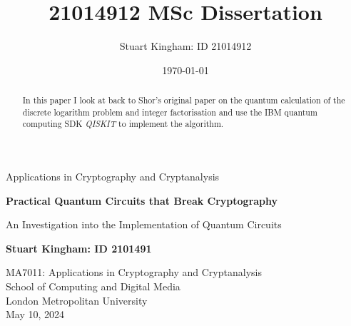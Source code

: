 \documentclass[11pt,a4paper]{article}
\author{Stuart Kingham: ID 21014912}
\title{21014912 MSc Dissertation}
\date{\today}
\begin{document}
\doublespacing

\begin{titlepage}
  \vspace*{\fill}
  \begin{center}
       \vspace*{1cm}

       {\LARGE Applications in Cryptography and Cryptanalysis}

       \vspace*{1cm}
       {\large \textbf{Practical Quantum Circuits that Break Cryptography}}
       
       \vspace{0.2cm}
       {\large An Investigation into the Implementation of Quantum Circuits}
            

       \vfill

       \textbf{Stuart Kingham: ID 2101491}

       \vfill
                        
       \vspace{0.8cm}
     

       MA7011: Applications in Cryptography and Cryptanalysis \\
       School of Computing and Digital Media\\
       London Metropolitan University\\
       May 10, 2024
            
  \end{center}
  \vspace*{\fill}
\end{titlepage}

\pagebreak

\begin{abstract}
  In this paper I look at back to Shor's original paper on the quantum
  calculation of the discrete logarithm problem and integer
  factorisation and use the IBM quantum computing SDK \emph{QISKIT} to
  implement the algorithm.
\end{abstract}

\newpage

\singlespacing 
\tableofcontents
\listoffigures

\doublespacing
{}

\newpage



\pagebreak

\printbibliography

\pagebreak

\appendix

\pagebreak

\printindex
\end{document}
